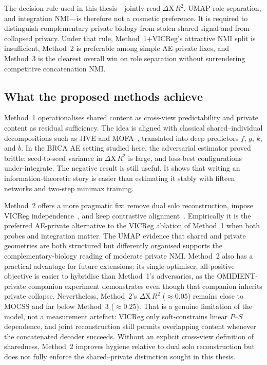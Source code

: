 The decision rule used in this thesis---jointly read $\Delta\mathrm{X}\,R^{2}$, UMAP role separation, and integration NMI---is therefore not a cosmetic preference. It is required to distinguish complementary private biology from stolen shared signal and from collapsed privacy. Under that rule, Method~1+VICReg's attractive NMI split is insufficient, Method~2 is preferable among simple AE-private fixes, and Method~3 is the clearest overall win on role separation without surrendering competitive concatenation NMI.

\subsection{What the proposed methods achieve}

Method~1 operationalises shared content as cross-view predictability and private content as residual sufficiency. The idea is aligned with classical shared--individual decompositions such as JIVE and MOFA~\citep{lock2013jive,argelaguet2018multi}, translated into deep predictors $f$, $g$, $k$, and $b$. In the BRCA AE setting studied here, the adversarial estimator proved brittle: seed-to-seed variance in $\Delta\mathrm{X}\,R^{2}$ is large, and loss-best configurations under-integrate. The negative result is still useful. It shows that writing an information-theoretic story is easier than estimating it stably with fifteen networks and two-step minimax training.

Method~2 offers a more pragmatic fix: remove dual solo reconstruction, impose VICReg independence~\citep{bardes2022vicreg}, and keep contrastive alignment~\citep{chen2020simple}. Empirically it is the preferred AE-private alternative to the VICReg ablation of Method~1 when both probes and integration matter. The UMAP evidence that shared and private geometries are both structured but differently organised supports the complementary-biology reading of moderate private NMI. Method~2 also has a practical advantage for future extensions: its single-optimiser, all-positive objective is easier to hybridise than Method~1's adversaries, as the OMIDIENT-private companion experiment demonstrates even though that companion inherits private collapse. Nevertheless, Method~2's $\Delta\mathrm{X}\,R^{2}$ ($\approx0.05$) remains close to MOCSS and far below Method~3 ($\approx0.25$). That is a genuine limitation of the model, not a measurement artefact: VICReg only soft-constrains linear $P$--$S$ dependence, and joint reconstruction still permits overlapping content whenever the concatenated decoder succeeds. Without an explicit cross-view definition of sharedness, Method~2 improves hygiene relative to dual solo reconstruction but does not fully enforce the shared--private distinction sought in this thesis.

